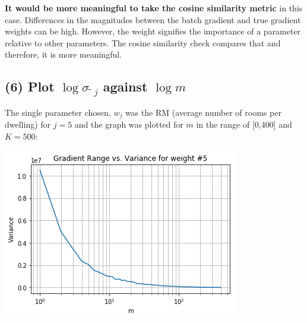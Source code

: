 \documentclass[10pt]{article}
\begin{document}
\textbf{It would be more meaningful to take the cosine similarity metric} in this case. Differences in the magnitudes between the batch gradient and true gradient weights can be high. However, the weight signifies the importance of a parameter relative to other parameters. The cosine similarity check compares that and therefore, it is more meaningful.

\pagebreak
\subsection{(6) Plot $\log{\sigma_{  ̃j}}$ against $\log m$}

The single parameter chosen,  $w_{j}$ was the RM (average number of rooms per dwelling) for $j=5$ and the graph was plotted for $m$ in the range of [0,400] and $K = 500$: 

\includegraphics[scale=1]{plot1.png}
\end{document}
